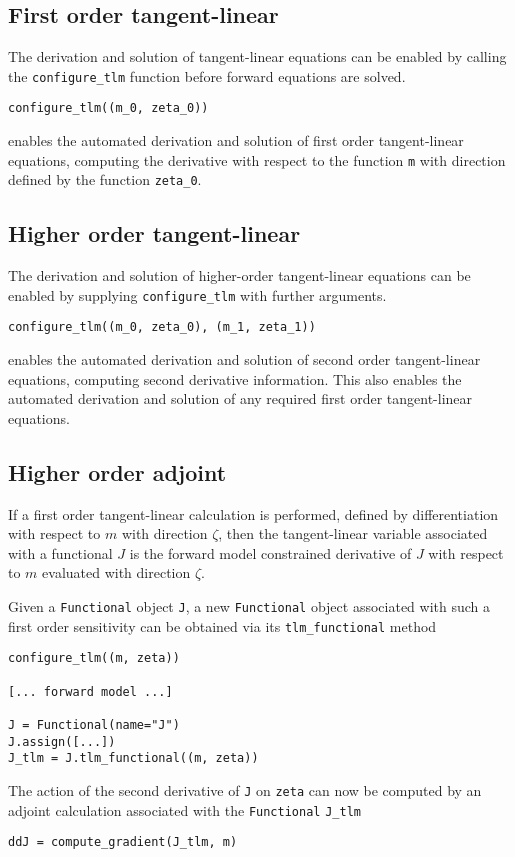 \documentclass[11pt]{article}
\begin{document}
\subsection{First order tangent-linear}

The derivation and solution of tangent-linear equations can be enabled by
calling the \texttt{configure\_tlm} function before forward equations are
solved.

\begin{lstlisting}
configure_tlm((m_0, zeta_0))
\end{lstlisting}
enables the automated derivation and solution of first order tangent-linear
equations, computing the derivative with respect to the function \texttt{m}
with direction defined by the function \texttt{zeta\_0}.

\subsection{Higher order tangent-linear}

The derivation and solution of higher-order tangent-linear equations can be
enabled by supplying \texttt{configure\_tlm} with further arguments.

\begin{lstlisting}
configure_tlm((m_0, zeta_0), (m_1, zeta_1))
\end{lstlisting}
enables the automated derivation and solution of second order tangent-linear
equations, computing second derivative information. This also enables the
automated derivation and solution of any required first order tangent-linear
equations.

\subsection{Higher order adjoint}\label{sect:higher_order_adjoint}

If a first order tangent-linear calculation is performed, defined by
differentiation with respect to $m$ with direction $\zeta$, then the
tangent-linear variable associated with a functional $J$ is the forward model
constrained derivative of $J$ with respect to $m$ evaluated with direction
$\zeta$.

Given a \texttt{Functional} object \texttt{J}, a new \texttt{Functional} object
associated with such a first order sensitivity can be obtained via its
\texttt{tlm\_functional} method
\begin{lstlisting}
configure_tlm((m, zeta))

[... forward model ...]

J = Functional(name="J")
J.assign([...])
J_tlm = J.tlm_functional((m, zeta))
\end{lstlisting}
The action of the second derivative of \texttt{J} on \texttt{zeta} can now be
computed by an adjoint calculation associated with the \texttt{Functional}
\texttt{J\_tlm}
\begin{lstlisting}
ddJ = compute_gradient(J_tlm, m)
\end{lstlisting}
\end{document}
